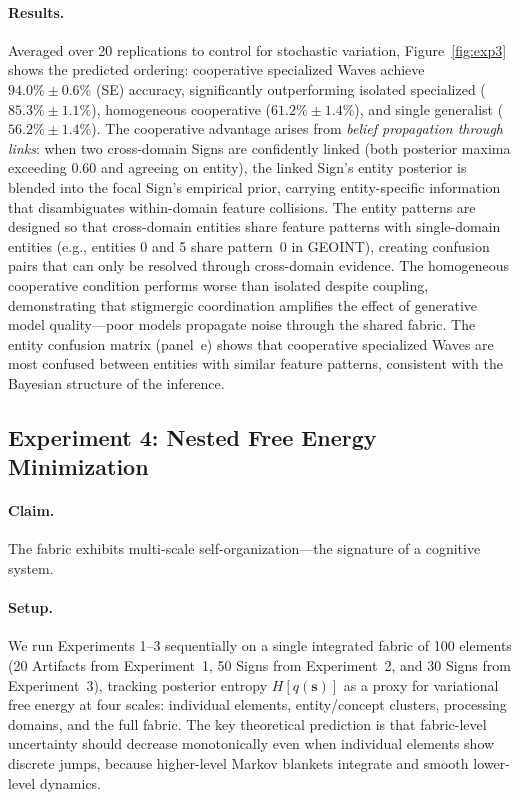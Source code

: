 \documentclass[11pt,a4paper]{article}
\theoremstyle{definition}
\newcommand{\bq}{q}
\newcommand{\bs}{\bm{s}}
\begin{document}
\paragraph{Results.} Averaged over 20 replications to control for stochastic variation, Figure~\ref{fig:exp3} shows the predicted ordering: cooperative specialized Waves achieve $94.0\% \pm 0.6\%$ (SE) accuracy, significantly outperforming isolated specialized ($85.3\% \pm 1.1\%$), homogeneous cooperative ($61.2\% \pm 1.4\%$), and single generalist ($56.2\% \pm 1.4\%$). The cooperative advantage arises from \emph{belief propagation through links}: when two cross-domain Signs are confidently linked (both posterior maxima exceeding $0.60$ and agreeing on entity), the linked Sign's entity posterior is blended into the focal Sign's empirical prior, carrying entity-specific information that disambiguates within-domain feature collisions. The entity patterns are designed so that cross-domain entities share feature patterns with single-domain entities (e.g., entities 0 and 5 share pattern~0 in GEOINT), creating confusion pairs that can only be resolved through cross-domain evidence. The homogeneous cooperative condition performs worse than isolated despite coupling, demonstrating that stigmergic coordination amplifies the effect of generative model quality---poor models propagate noise through the shared fabric. The entity confusion matrix (panel~e) shows that cooperative specialized Waves are most confused between entities with similar feature patterns, consistent with the Bayesian structure of the inference.

\subsection{Experiment 4: Nested Free Energy Minimization}
\label{sec:exp4}

\paragraph{Claim.} The fabric exhibits multi-scale self-organization---the signature of a cognitive system.

\paragraph{Setup.} We run Experiments 1--3 sequentially on a single integrated fabric of 100 elements (20 Artifacts from Experiment~1, 50 Signs from Experiment~2, and 30 Signs from Experiment~3), tracking posterior entropy $H[\bq(\bs)]$ as a proxy for variational free energy at four scales: individual elements, entity/concept clusters, processing domains, and the full fabric. The key theoretical prediction is that fabric-level uncertainty should decrease monotonically even when individual elements show discrete jumps, because higher-level Markov blankets integrate and smooth lower-level dynamics.
\end{document}
